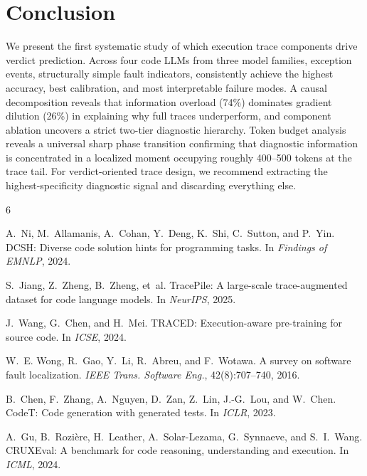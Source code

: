 \documentclass[11pt,a4paper]{article}
\begin{document}
\section{Conclusion}

We present the first systematic study of which execution trace components drive verdict prediction. Across four code LLMs from three model families, exception events, structurally simple fault indicators, consistently achieve the highest accuracy, best calibration, and most interpretable failure modes. A causal decomposition reveals that information overload (74\%) dominates gradient dilution (26\%) in explaining why full traces underperform, and component ablation uncovers a strict two-tier diagnostic hierarchy. Token budget analysis reveals a universal sharp phase transition confirming that diagnostic information is concentrated in a localized moment occupying roughly 400--500 tokens at the trace tail. For verdict-oriented trace design, we recommend extracting the highest-specificity diagnostic signal and discarding everything else.

\begin{thebibliography}{6}

A.~Ni, M.~Allamanis, A.~Cohan, Y.~Deng, K.~Shi, C.~Sutton, and P.~Yin.
DCSH: Diverse code solution hints for programming tasks.
In \emph{Findings of EMNLP}, 2024.

S.~Jiang, Z.~Zheng, B.~Zheng, et~al.
TracePile: A large-scale trace-augmented dataset for code language models.
In \emph{NeurIPS}, 2025.

J.~Wang, G.~Chen, and H.~Mei.
TRACED: Execution-aware pre-training for source code.
In \emph{ICSE}, 2024.

W.~E. Wong, R.~Gao, Y.~Li, R.~Abreu, and F.~Wotawa.
A survey on software fault localization.
\emph{IEEE Trans. Software Eng.}, 42(8):707--740, 2016.

B.~Chen, F.~Zhang, A.~Nguyen, D.~Zan, Z.~Lin, J.-G.~Lou, and W.~Chen.
CodeT: Code generation with generated tests.
In \emph{ICLR}, 2023.

A.~Gu, B.~Rozi\`{e}re, H.~Leather, A.~Solar-Lezama, G.~Synnaeve, and S.~I.~Wang.
CRUXEval: A benchmark for code reasoning, understanding and execution.
In \emph{ICML}, 2024.

\end{thebibliography}
\end{document}
